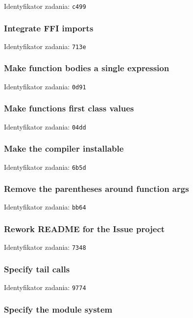 Identyfikator zadania: \texttt{c499}

\subsubsection{Integrate FFI imports}

Identyfikator zadania: \texttt{713e}

\subsubsection{Make function bodies a single expression}

Identyfikator zadania: \texttt{0d91}

\subsubsection{Make functions first class values}

Identyfikator zadania: \texttt{04dd}

\subsubsection{Make the compiler installable}

Identyfikator zadania: \texttt{6b5d}

\subsubsection{Remove the parentheses around function args}

Identyfikator zadania: \texttt{bb64}

\subsubsection{Rework README for the Issue project}

Identyfikator zadania: \texttt{7348}

\subsubsection{Specify tail calls}

Identyfikator zadania: \texttt{9774}

\subsubsection{Specify the module system}


